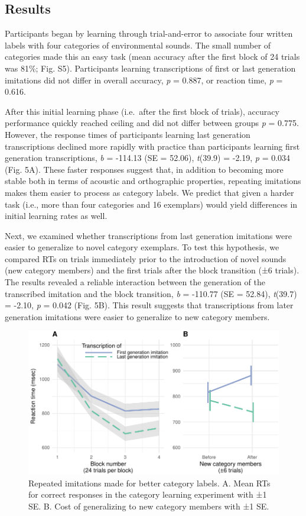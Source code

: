 \documentclass[english,floatsintext,man]{apa6}
\theoremstyle{definition}
\theoremstyle{definition}
\theoremstyle{definition}
\theoremstyle{remark}
\begin{document}
\hypertarget{results-2}{%
\subsection{Results}\label{results-2}}

Participants began by learning through trial-and-error to associate four
written labels with four categories of environmental sounds. The small
number of categories made this an easy task (mean accuracy after the
first block of 24 trials was 81\%; Fig. S5). Participants learning
transcriptions of first or last generation imitations did not differ in
overall accuracy, \emph{p} = 0.887, or reaction time, \emph{p} = 0.616.

After this initial learning phase (i.e.~after the first block of
trials), accuracy performance quickly reached ceiling and did not differ
between groups \emph{p} = 0.775. However, the response times of
participants learning last generation transcriptions declined more
rapidly with practice than participants learning first generation
transcriptions, \emph{b} = -114.13 (SE = 52.06), \emph{t}(39.9) = -2.19,
\emph{p} = 0.034 (Fig. 5A). These faster responses suggest that, in
addition to becoming more stable both in terms of acoustic and
orthographic properties, repeating imitations makes them easier to
process as category labels. We predict that given a harder task (i.e.,
more than four categories and 16 exemplars) would yield differences in
initial learning rates as well.

Next, we examined whether transcriptions from last generation imitations
were easier to generalize to novel category exemplars. To test this
hypothesis, we compared RTs on trials immediately prior to the
introduction of novel sounds (new category members) and the first trials
after the block transition (±6 trials). The results revealed a reliable
interaction between the generation of the transcribed imitation and the
block transition, \emph{b} = -110.77 (SE = 52.84), \emph{t}(39.7) =
-2.10, \emph{p} = 0.042 (Fig. 5B). This result suggests that
transcriptions from later generation imitations were easier to
generalize to new category members.

\begin{figure}
\centering
\includegraphics{fig5-1.pdf}
\caption{\label{fig:fig5}Repeated imitations made for better category
labels. A. Mean RTs for correct responses in the category learning
experiment with ±1 SE. B. Cost of generalizing to new category members
with ±1 SE.}
\end{figure}
\end{document}
